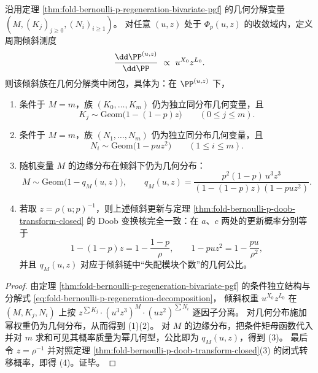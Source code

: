 \begin{proposition}\label{prop:fold-bernoulli-p-cycle-tilt-geometric-closure}
沿用定理 \ref{thm:fold-bernoulli-p-regeneration-bivariate-pgf} 的几何分解变量
\(
(M,(K_j)_{j\ge 0},(N_i)_{i\ge 1})
\)。
对任意 \((u,z)\) 处于 \(\Phi_p(u,z)\) 的收敛域内，定义周期倾斜测度
\[
\frac{\dd \PP^{(u,z)}}{\dd \PP}\ \propto\ u^{X_0}z^{L_0}.
\]
则该倾斜族在几何分解类中闭包，具体为：在 \(\PP^{(u,z)}\) 下，
\begin{enumerate}
  \item 条件于 \(M=m\)，族 \((K_0,\dots,K_m)\) 仍为独立同分布几何变量，且
  \[
  K_j\sim \mathrm{Geom}\!\bigl(1-(1-p)z\bigr)\qquad(0\le j\le m).
  \]
  \item 条件于 \(M=m\)，族 \((N_1,\dots,N_m)\) 仍为独立同分布几何变量，且
  \[
  N_i\sim \mathrm{Geom}\!\bigl(1-pu z^2\bigr)\qquad(1\le i\le m).
  \]
  \item 随机变量 \(M\) 的边缘分布在倾斜下仍为几何分布：
  \[
  M\sim \mathrm{Geom}\!\bigl(1-q_M(u,z)\bigr),
  \qquad
  q_M(u,z)=\frac{p^2(1-p)\,u^3z^3}{(1-(1-p)z)(1-pu z^2)}.
  \]
  \item 若取 \(z=\rho(u;p)^{-1}\)，则上述倾斜更新与定理 \ref{thm:fold-bernoulli-p-doob-transform-closed} 的 Doob 变换核完全一致：在 \(a\)、\(c\) 两处的更新概率分别等于
  \[
  1-(1-p)z=1-\frac{1-p}{\rho},
  \qquad
  1-pu z^2=1-\frac{pu}{\rho^2},
  \]
  并且 \(q_M(u,z)\) 对应于倾斜链中“失配模块个数”的几何公比。
\end{enumerate}
\end{proposition}
\begin{proof}
由定理 \ref{thm:fold-bernoulli-p-regeneration-bivariate-pgf} 的条件独立结构与分解式
\eqref{eq:fold-bernoulli-p-regeneration-decomposition}，
倾斜权重 \(u^{X_0}z^{L_0}\) 在 \((M,K_j,N_i)\) 上按
\(
z^{\sum K_j}\cdot (u^3z^3)^M\cdot (u z^2)^{\sum N_i}
\)
逐因子分离。
对几何分布施加幂权重仍为几何分布，从而得到 (1)(2)。
对 \(M\) 的边缘分布，把条件矩母函数代入并对 \(m\) 求和可见其概率质量为幂几何型，公比即为 \(q_M(u,z)\)，得到 (3)。
最后令 \(z=\rho^{-1}\) 并对照定理 \ref{thm:fold-bernoulli-p-doob-transform-closed}(3) 的闭式转移概率，即得 (4)。证毕。
\end{proof}

\endinput

